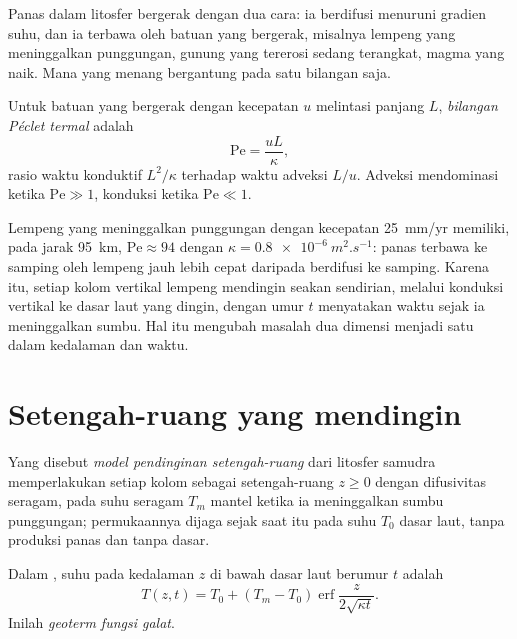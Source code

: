 Panas dalam litosfer bergerak dengan dua cara: ia berdifusi menuruni
gradien suhu, dan ia terbawa oleh batuan yang bergerak, misalnya lempeng yang meninggalkan punggungan, gunung
yang tererosi sedang terangkat, magma yang naik. Mana yang menang bergantung pada satu
bilangan saja.

\begin{definition}\label{def:b3:lithosphere-thermal-models:peclet}
Untuk batuan yang bergerak dengan kecepatan $u$ melintasi panjang $L$, \emph{bilangan Péclet
termal} adalah
\[
  \mathrm{Pe} = \frac{uL}{\kappa},
\]
rasio waktu konduktif $L^2/\kappa$ terhadap waktu adveksi $L/u$.
Adveksi mendominasi ketika $\mathrm{Pe} \gg 1$, konduksi ketika
$\mathrm{Pe} \ll 1$.
\end{definition}

Lempeng yang meninggalkan punggungan dengan kecepatan \qty{25}{mm/yr} memiliki, pada jarak
\qty{95}{km}, $\mathrm{Pe} \approx 94$ dengan $\kappa = \qty{0.8e-6}{m^2.s^{-1}}$:
panas terbawa ke samping oleh lempeng jauh lebih cepat daripada berdifusi ke samping.
Karena itu, setiap kolom vertikal lempeng mendingin seakan sendirian, melalui
konduksi vertikal ke dasar laut yang dingin, dengan umur $t$ menyatakan waktu sejak
ia meninggalkan sumbu. Hal itu mengubah masalah dua dimensi menjadi satu dalam
kedalaman dan waktu.

\section{Setengah-ruang yang mendingin}

\begin{definition}\label{def:b3:lithosphere-thermal-models:half-space}
Yang disebut \emph{model pendinginan setengah-ruang} dari
litosfer samudra memperlakukan setiap kolom sebagai setengah-ruang $z \ge 0$ dengan
difusivitas seragam, pada suhu seragam $T_m$ mantel ketika ia meninggalkan
sumbu punggungan; permukaannya dijaga sejak saat itu pada suhu $T_0$ dasar
laut, tanpa produksi panas dan tanpa dasar.
\end{definition}

\begin{theorem}\label{thm:b3:lithosphere-thermal-models:erf}
Dalam , suhu pada kedalaman $z$ di bawah
dasar laut berumur $t$ adalah
\[
  T(z, t) = T_0 + (T_m - T_0)\operatorname{erf}\frac{z}{2\sqrt{\kappa t}} .
\]
Inilah \emph{geoterm fungsi galat}.
\end{theorem}

